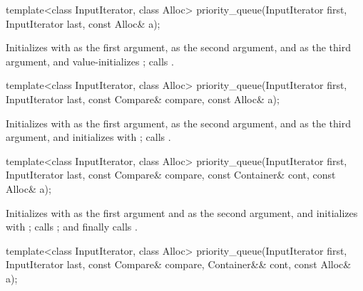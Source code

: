 %
\begin{itemdecl}
template<class InputIterator, class Alloc>
  priority_queue(InputIterator first, InputIterator last, const Alloc& a);
\end{itemdecl}

\begin{itemdescr}
\pnum
\effects
Initializes  with
 as the first argument,
 as the second argument, and
 as the third argument, and
value-initializes ;
calls .
\end{itemdescr}

%
\begin{itemdecl}
template<class InputIterator, class Alloc>
  priority_queue(InputIterator first, InputIterator last, const Compare& compare, const Alloc& a);
\end{itemdecl}

\begin{itemdescr}
\pnum
\effects
Initializes  with
 as the first argument,
 as the second argument, and
 as the third argument, and
initializes  with ;
calls .
\end{itemdescr}

%
\begin{itemdecl}
template<class InputIterator, class Alloc>
  priority_queue(InputIterator first, InputIterator last, const Compare& compare,
                 const Container& cont, const Alloc& a);
\end{itemdecl}

\begin{itemdescr}
\pnum
\effects
Initializes  with
 as the first argument and  as the second argument, and
initializes  with ;
calls ; and
finally calls .
\end{itemdescr}

%
\begin{itemdecl}
template<class InputIterator, class Alloc>
  priority_queue(InputIterator first, InputIterator last, const Compare& compare, Container&& cont,
                 const Alloc& a);
\end{itemdecl}

